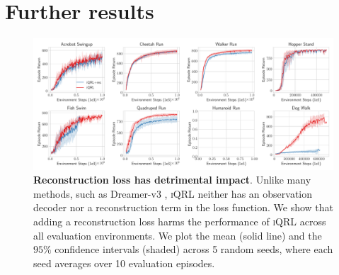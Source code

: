 \documentclass{article}
\theoremstyle{plain}
\theoremstyle{definition}
\theoremstyle{remark}
\newcommand{\our}{\textsc{iQRL}\xspace}
\begin{document}
\section{Further results}


\begin{figure}[ht]
\vskip 0.2in
\begin{center}
\centerline{\includegraphics[width=1.0\textwidth]{./figs/reconstruction-loss-ablation.pdf}}
\caption{\textbf{Reconstruction loss has detrimental impact}. Unlike many methods, such as Dreamer-v3 \cite{hafner2023mastering}, \our neither has an observation decoder nor a reconstruction term in the loss function. We show that adding a reconstruction loss harms the performance of \our across all evaluation environments. We plot the mean (solid line) and the $95\%$ confidence intervals (shaded) across 5 random seeds, where each seed averages over 10 evaluation episodes.}
\label{fig:multi-task-pretraining}
\end{center}
\vskip -0.2in
\end{figure}



\end{document}
